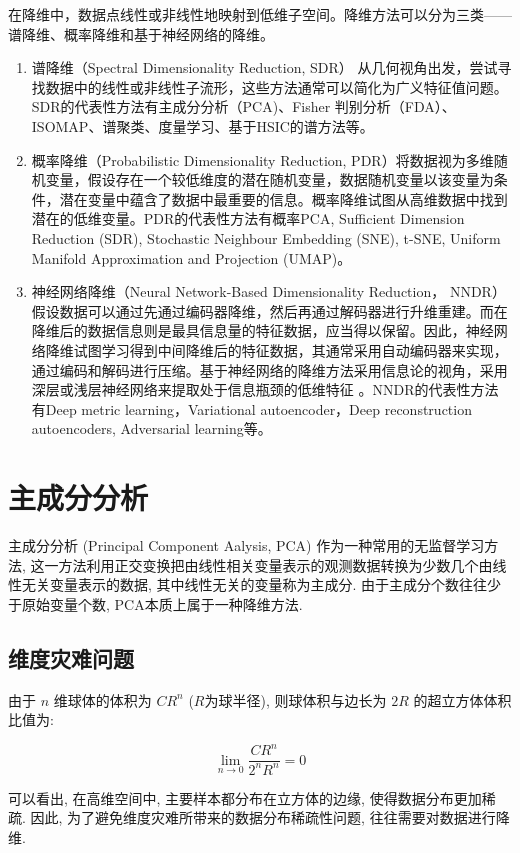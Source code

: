 \documentclass[lang=cn,10pt]{gorgeousnbook}
\numberwithin{equation}{section}%
\numberwithin{figure}{section}%
\begin{document}
在降维中，数据点线性或非线性地映射到低维子空间。降维方法可以分为三类——谱降维、概率降维和基于神经网络的降维。
\begin{enumerate}
\item 谱降维（Spectral Dimensionality Reduction, SDR） 从几何视角出发，尝试寻找数据中的线性或非线性子流形，这些方法通常可以简化为广义特征值问题。SDR的代表性方法有主成分分析（PCA)、Fisher 判别分析（FDA）、ISOMAP、谱聚类、度量学习、基于HSIC的谱方法等。
\item 概率降维（Probabilistic Dimensionality Reduction, PDR）将数据视为多维随机变量，假设存在一个较低维度的潜在随机变量，数据随机变量以该变量为条件，潜在变量中蕴含了数据中最重要的信息。概率降维试图从高维数据中找到潜在的低维变量。PDR的代表性方法有概率PCA, Sufficient Dimension Reduction (SDR), Stochastic Neighbour Embedding (SNE), t-SNE, Uniform Manifold Approximation and Projection (UMAP)。
\item 神经网络降维（Neural Network-Based Dimensionality Reduction， NNDR）假设数据可以通过先通过编码器降维，然后再通过解码器进行升维重建。而在降维后的数据信息则是最具信息量的特征数据，应当得以保留。因此，神经网络降维试图学习得到中间降维后的特征数据，其通常采用自动编码器来实现，通过编码和解码进行压缩。基于神经网络的降维方法采用信息论的视角，采用深层或浅层神经网络来提取处于信息瓶颈的低维特征 。NNDR的代表性方法有Deep metric learning，Variational autoencoder，Deep reconstruction autoencoders,  Adversarial learning等。
\end{enumerate}

\section{主成分分析}
主成分分析 (Principal Component Aalysis, PCA) 作为一种常用的无监督学习方法, 这一方法利用正交变换把由线性相关变量表示的观测数据转换为少数几个由线性无关变量表示的数据, 其中线性无关的变量称为主成分. 由于主成分个数往往少于原始变量个数, PCA本质上属于一种降维方法.
\subsection{ 维度灾难问题}
由于 $n$ 维球体的体积为 $CR^n$ ($R$为球半径), 则球体积与边长为 $2R$ 的超立方体体积比值为:


\begin{equation}
\underset{n\rightarrow 0}{\lim}\frac{CR^n}{2^nR^n}=0
\end{equation}


可以看出, 在高维空间中, 主要样本都分布在立方体的边缘, 使得数据分布更加稀疏. 因此, 为了避免维度灾难所带来的数据分布稀疏性问题, 往往需要对数据进行降维. 
\end{document}
